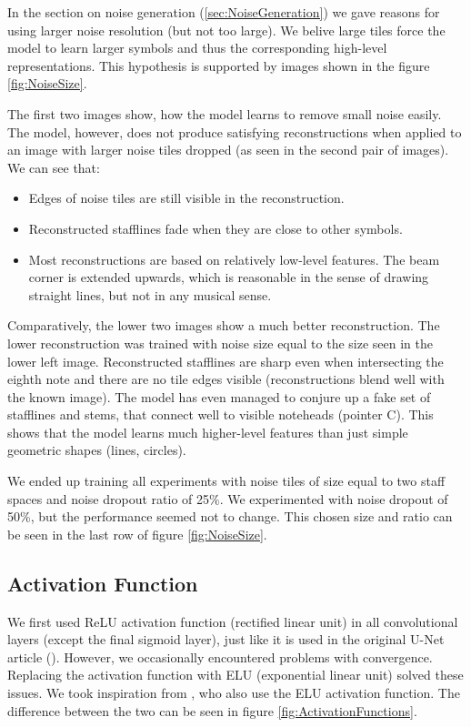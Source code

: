 In the section on noise generation (\ref{sec:NoiseGeneration}) we gave reasons for using larger noise resolution (but not too large). We belive large tiles force the model to learn larger symbols and thus the corresponding high-level representations. This hypothesis is supported by images shown in the figure \ref{fig:NoiseSize}.

The first two images show, how the model learns to remove small noise easily. The model, however, does not produce satisfying reconstructions when applied to an image with larger noise tiles dropped (as seen in the second pair of images). We can see that:

\begin{itemize}
    \item Edges of noise tiles are still visible in the reconstruction.
    \item Reconstructed stafflines fade when they are close to other symbols.
    \item Most reconstructions are based on relatively low-level features. The beam corner is extended upwards, which is reasonable in the sense of drawing straight lines, but not in any musical sense.
\end{itemize}

Comparatively, the lower two images show a much better reconstruction. The lower reconstruction was trained with noise size equal to the size seen in the lower left image. Reconstructed stafflines are sharp even when intersecting the eighth note and there are no tile edges visible (reconstructions blend well with the known image). The model has even managed to conjure up a fake set of stafflines and stems, that connect well to visible noteheads (pointer C). This shows that the model learns much higher-level features than just simple geometric shapes (lines, circles).

We ended up training all experiments with noise tiles of size equal to two staff spaces and noise dropout ratio of 25\%. We experimented with noise dropout of 50\%, but the performance seemed not to change. This chosen size and ratio can be seen in the last row of figure \ref{fig:NoiseSize}.


\subsection{Activation Function}
\label{sec:ActivationFunction}

We first used ReLU activation function (rectified linear unit) in all convolutional layers (except the final sigmoid layer), just like it is used in the original U-Net article (\cite{UNet}). However, we occasionally encountered problems with convergence. Replacing the activation function with ELU (exponential linear unit) solved these issues. We took inspiration from \cite{DorferEtAl}, who also use the ELU activation function. The difference between the two can be seen in figure \ref{fig:ActivationFunctions}.

